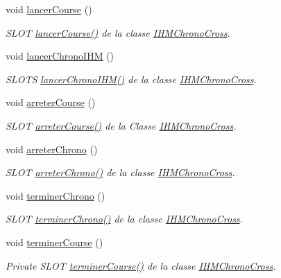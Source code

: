 \begin{DoxyCompactItemize}
void \hyperlink{class_i_h_m_chrono_cross_ace90922ce4c4ffeed6f1e8eb84c8c7a5}{lancer\+Course} ()
\begin{DoxyCompactList}\small\item\em S\+L\+OT \hyperlink{class_i_h_m_chrono_cross_ace90922ce4c4ffeed6f1e8eb84c8c7a5}{lancer\+Course()} de la classe \hyperlink{class_i_h_m_chrono_cross}{I\+H\+M\+Chrono\+Cross}. \end{DoxyCompactList}\item 
void \hyperlink{class_i_h_m_chrono_cross_a0e78f2d4d5e46c4551fc4517614a56d8}{lancer\+Chrono\+I\+HM} ()
\begin{DoxyCompactList}\small\item\em S\+L\+O\+TS \hyperlink{class_i_h_m_chrono_cross_a0e78f2d4d5e46c4551fc4517614a56d8}{lancer\+Chrono\+I\+H\+M()} de la classe \hyperlink{class_i_h_m_chrono_cross}{I\+H\+M\+Chrono\+Cross}. \end{DoxyCompactList}\item 
void \hyperlink{class_i_h_m_chrono_cross_ad3d8f287d08dd9aa0c6b10c9973672a4}{arreter\+Course} ()
\begin{DoxyCompactList}\small\item\em S\+L\+OT \hyperlink{class_i_h_m_chrono_cross_ad3d8f287d08dd9aa0c6b10c9973672a4}{arreter\+Course()} de la Classe \hyperlink{class_i_h_m_chrono_cross}{I\+H\+M\+Chrono\+Cross}. \end{DoxyCompactList}\item 
void \hyperlink{class_i_h_m_chrono_cross_a8d5c89a4d2ca34252acd8737e29d37fe}{arreter\+Chrono} ()
\begin{DoxyCompactList}\small\item\em S\+L\+OT \hyperlink{class_i_h_m_chrono_cross_a8d5c89a4d2ca34252acd8737e29d37fe}{arreter\+Chrono()} de la classe \hyperlink{class_i_h_m_chrono_cross}{I\+H\+M\+Chrono\+Cross}. \end{DoxyCompactList}\item 
void \hyperlink{class_i_h_m_chrono_cross_a32ee157ca6bd8c3e94b57f3cecdeee4e}{terminer\+Chrono} ()
\begin{DoxyCompactList}\small\item\em S\+L\+OT \hyperlink{class_i_h_m_chrono_cross_a32ee157ca6bd8c3e94b57f3cecdeee4e}{terminer\+Chrono()} de la classe \hyperlink{class_i_h_m_chrono_cross}{I\+H\+M\+Chrono\+Cross}. \end{DoxyCompactList}\item 
void \hyperlink{class_i_h_m_chrono_cross_ac89c6ec3040e8b787f1fbdb670405023}{terminer\+Course} ()
\begin{DoxyCompactList}\small\item\em Private S\+L\+OT \hyperlink{class_i_h_m_chrono_cross_ac89c6ec3040e8b787f1fbdb670405023}{terminer\+Course()} de la classe \hyperlink{class_i_h_m_chrono_cross}{I\+H\+M\+Chrono\+Cross}. \end{DoxyCompactList}\item 

\end{DoxyCompactItemize}
